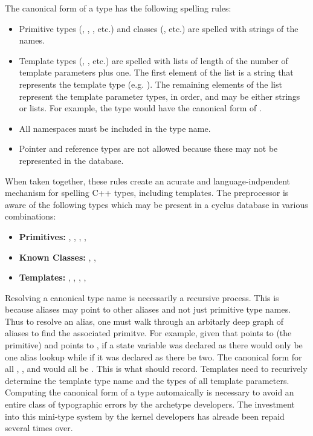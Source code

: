 The canonical form of a type has the following spelling rules:
\begin{itemize}
    \item Primitive types (, , , etc.) 
          and classes (, etc.) are spelled with strings 
          of the names.
    \item Template types (, , etc.) are spelled 
          with lists of length of the number of template parameters plus one.
          The first element of the list is a string that represents the 
          template type (e.g. ). The remaining elements of 
          the list represent the template parameter types, in order, and may 
          be either strings or lists.  For example, the type 
           would have the canonical form 
          of .
    \item All namespaces must be included in the type name.
    \item Pointer and reference types are not allowed because these may not be 
          represented in the database.
\end{itemize}
When taken together, these rules create an acurate and language-indpendent
mechanism for spelling C++ types, including templates. The preprocessor is aware
of the following types which may be present in a cyclus database in various 
combinations:
\begin{itemize}
    \item \textbf{Primitives:} , , , , 
    \item \textbf{Known Classes:} , , 
    \item \textbf{Templates:} , , , 
                              , 
\end{itemize}

Resolving a canonical type name is necessarily a recursive process.
This is because aliases may point to other aliases and not just primitive type names.
Thus to resolve an alias, one must walk through an arbitarly deep graph of aliases 
to find the associated primitve.  For example, given that  points 
to  (the primitive) and  points to , 
if a state variable was declared as  there would only be one 
alias lookup while if it was declared as  there be two. The canonical
form for all , , and  would all be 
.  This is what \cycpp should record.  Templates need to recurively 
determine the template type name and the types of all template parameters.
Computing the canonical form of a type automaically is necessary to avoid an 
entire class of typographic errors by the archetype developers.  The investment
into this mini-type system by the kernel developers has alreade been repaid several 
times over.

